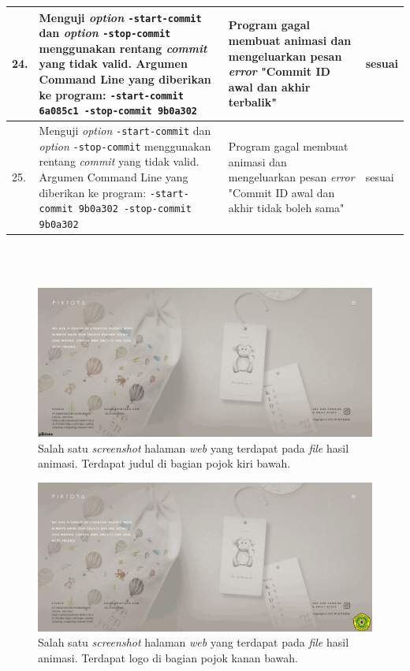 \begin{table}[htbp]
\begin{tabular}{|p{0.3cm}|>{\raggedright} p{7 cm}| p{5.5 cm}| p{3 cm}|}
		24. & Menguji \textit{option} \texttt{-start-commit} dan \textit{option} \texttt{-stop-commit} menggunakan rentang \textit{commit} yang tidak valid. Argumen Command Line yang diberikan ke program: \texttt{-start-commit 6a085c1 -stop-commit 9b0a302} & Program gagal membuat animasi dan mengeluarkan pesan \textit{error} "Commit ID awal dan akhir terbalik"  & sesuai\\ \hline
		25. & Menguji \textit{option} \texttt{-start-commit} dan \textit{option} \texttt{-stop-commit} menggunakan rentang \textit{commit} yang tidak valid. Argumen Command Line yang diberikan ke program: \texttt{-start-commit 9b0a302  -stop-commit 9b0a302} & Program gagal membuat animasi dan mengeluarkan pesan \textit{error} "Commit ID awal dan akhir tidak boleh sama" & sesuai  \\ \hline
\end{tabular}
	\label{table:hasil_pengujian3}
\end{table}


\ \\
\ \\
\begin{figure}[H]
	\centering
		\includegraphics[scale=0.3]{Gambar/title.png}
	\caption{Salah satu \textit{screenshot} halaman \textit{web} yang terdapat pada \textit{file} hasil animasi. Terdapat judul di bagian pojok kiri bawah.}
	\label{fig:title}
\end{figure}


\begin{figure}[H]
	\centering
		\includegraphics[scale=0.3]{Gambar/logo.png}
	\caption{Salah satu \textit{screenshot} halaman \textit{web} yang terdapat pada \textit{file} hasil animasi. Terdapat logo di bagian pojok kanan bawah.}
	\label{fig:logo}
\end{figure}

